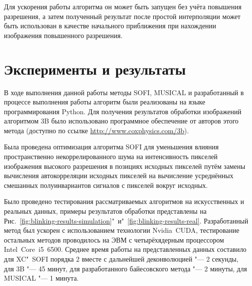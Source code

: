 Для ускорения работы алгоритма он может быть запущен без учёта повышения разрешения, а затем полученный результат после простой интерполяции может быть использован в качестве начального приближения при нахождении изображения повышенного разрешения.


\section{Эксперименты и результаты}

В ходе выполнения данной работы методы SOFI, MUSICAL и разработанный в процессе выполнения работы алгоритм были реализованы на языке программирования Python. Для получения результатов обработки изображений алгоритмом 3B было использовано программное обеспечение от авторов этого метода (доступно по ссылке \url{http://www.coxphysics.com/3b}).

Была проведена оптимизация алгоритма SOFI для уменьшения влияния пространственно некоррелированного шума на интенсивность пикселей изображения высокого разрешения в позициях исходных пикселей путём замены вычисления автокорреляции исходных пикселей на вычисление усреднённых смешанных полуинвариантов сигналов с пикселей вокруг исходных.

Было проведено тестирования рассматриваемых алгоритмов на искусственных и реальных данных, примеры результатов обработки представлены на Рис.~\ref{fig:blinking-results-simulation}"~и"~\ref{fig:blinking-results-real}. Разработанный метод был ускорен с использованием технологии Nvidia~CUDA, тестирование остальных методов проводилось на ЭВМ с четырёхядерным процессором Intel~Core~i5~6500. Среднее время работы на представленных данных составило для XC"~SOFI порядка 2 вместе с дальнейшей деконволюцией "--- 2 секунды, для 3B "--- 45 минут, для разработанного байесовского метода "--- 2 минуты, для MUSICAL "--- 1 минута.

